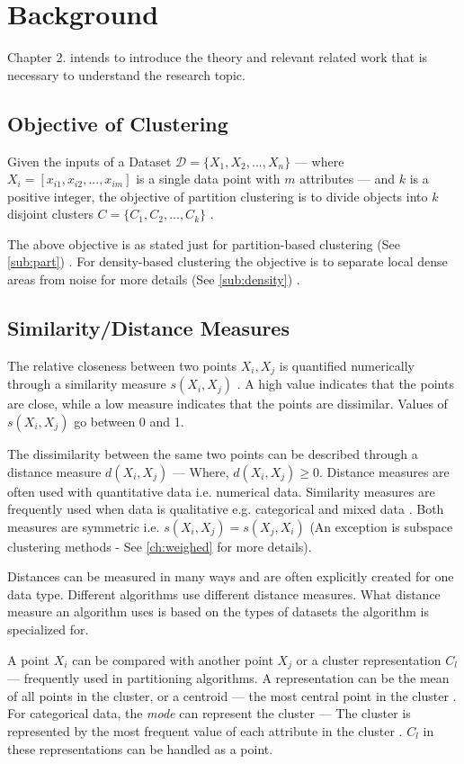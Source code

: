 \documentclass[../report.tex]{subfiles}
\begin{document}
\chapter{Background}
Chapter 2. intends to introduce the theory and relevant related work that is necessary to understand the research topic.

\section{Objective of Clustering}
Given the inputs of a Dataset $\mathcal{D} = \{X_{ 1 }, X_{ 2 },..., X_{ n } \}$ --- where $X_i = [x_{i1}, x_{i2},...,x_{im} ]$ is a single data point with $m$ attributes --- and $k$ is a positive integer, the objective of partition clustering is to divide objects into $k$ disjoint clusters ${C} = \{C_1, C_2,..., C_k \}$ \cite{Huang97clusteringlarge}.

The above objective is as stated just for partition-based clustering (See \ref{sub:part})
. For density-based clustering the objective is to separate local dense areas from noise for more details (See \ref{sub:density}) \cite{Ester1996}.

\section{Similarity/Distance Measures}
\label{ch:sim}
The relative closeness between two points $X_i, X_j$ is quantified numerically through a similarity measure $s(X_i, X_j)$ \cite{diday1976clustering}. A high value indicates that the points are close, while a low measure indicates that the points are dissimilar. Values of $s(X_i, X_j)$ go between 0 and 1.

The dissimilarity between the same two points can be described through a distance measure $d(X_i, X_j)$ --- Where, $d(X_i, X_j) \geq 0$. Distance measures are often used with quantitative data i.e. numerical data. Similarity measures are frequently used when data is qualitative e.g. categorical and mixed data \cite{Wunsch2005}. Both measures are symmetric i.e. $s(X_i, X_j) = s(X_j, X_i)$ (An exception is subspace clustering methods - See \ref{ch:weighed} for more details).

Distances can be measured in many ways and are often explicitly created for one data type. Different algorithms use different distance measures. What distance measure an algorithm uses is based on the types of datasets the algorithm is specialized for.

A point $X_i$ can be compared with another point $X_j$ or a cluster representation $C_l$ --- frequently used in partitioning algorithms. A representation can be the mean of all points in the cluster, or a centroid --- the most central point in the cluster \cite{Guha2000, Kaufman1990}. For categorical data, the \textit{mode} can represent the cluster --- The cluster is represented by the most frequent value of each attribute in the cluster \cite{Ng1999}. $C_l$ in these representations can be handled as a point.
\end{document}
